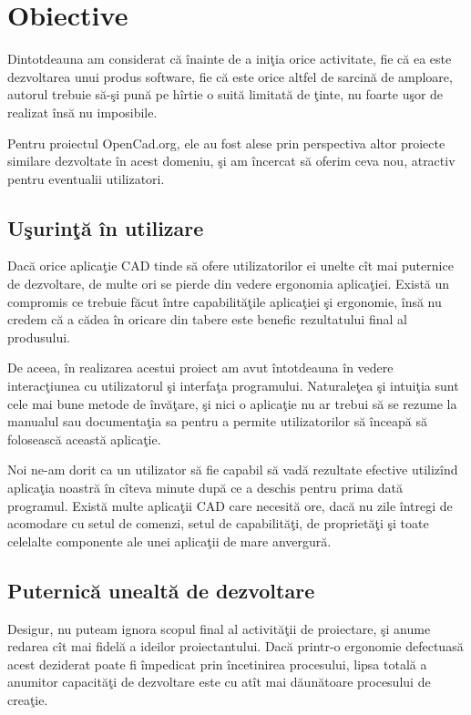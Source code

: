 \chapter{Obiective}

Dintotdeauna am considerat că înainte de a iniţia orice activitate, fie că ea
este dezvoltarea unui produs software, fie că este orice altfel de sarcină de
amploare, autorul trebuie să-şi pună pe hîrtie o suită limitată de ţinte, nu
foarte uşor de realizat însă nu imposibile.

Pentru proiectul OpenCad.org, ele au fost alese prin perspectiva altor proiecte
similare dezvoltate în acest domeniu, şi am încercat să oferim ceva nou,
atractiv pentru eventualii utilizatori.

\section*{Uşurinţă în utilizare}

Dacă orice aplicaţie CAD tinde să ofere utilizatorilor ei unelte cît mai
puternice de dezvoltare, de multe ori se pierde din vedere ergonomia aplicaţiei.
Există un compromis ce trebuie făcut între capabilităţile aplicaţiei şi
ergonomie, însă nu credem că a cădea în oricare din tabere este benefic
rezultatului final al produsului.

De aceea, în realizarea acestui proiect am avut întotdeauna în vedere
interacţiunea cu utilizatorul şi interfaţa programului. Naturaleţea şi intuiţia
sunt cele mai bune metode de învăţare, şi nici o aplicaţie nu ar trebui să se
rezume la manualul sau documentaţia sa pentru a permite utilizatorilor să
înceapă să folosească această aplicaţie.

Noi ne-am dorit ca un utilizator să fie capabil să vadă rezultate efective
utilizînd aplicaţia noastră în cîteva minute după ce a deschis pentru prima dată
programul. Există multe aplicaţii CAD care necesită ore, dacă nu zile întregi de
acomodare cu setul de comenzi, setul de capabilităţi, de proprietăţi şi toate
celelalte componente ale unei aplicaţii de mare anvergură.

\section*{Puternică unealtă de dezvoltare}

Desigur, nu puteam ignora scopul final al activităţii de proiectare, şi anume
redarea cît mai fidelă a ideilor proiectantului. Dacă printr-o ergonomie
defectuasă acest deziderat poate fi împedicat prin încetinirea procesului, lipsa
totală a anumitor capacităţi de dezvoltare este cu atît mai dăunătoare
procesului de creaţie.

